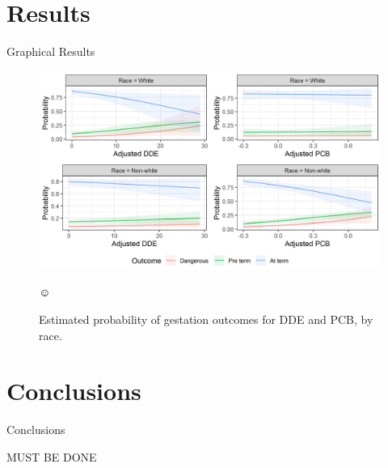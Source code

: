 \documentclass{beamer}
\begin{document}
\section{Results}

\begin{frame}{Graphical Results}
\begin{figure}
	\centering
	\includegraphics[width=1\textwidth]{results.jpeg}
	\caption{Estimated probability of gestation outcomes for DDE and PCB, by race.}
	\label{fig:corrPCB}☺
\end{figure}

\end{frame}


\section{Conclusions}
\begin{frame}{Conclusions}

MUST BE DONE

\end{frame}
\end{document}

